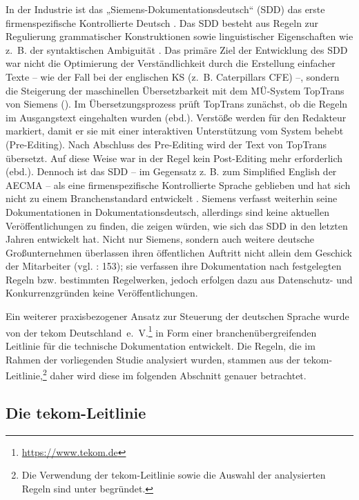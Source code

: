 In der Industrie ist das „Siemens-Dokumentationsdeutsch“ (SDD) das erste firmenspezifische Kontrollierte Deutsch \citep[375]{Göpferich2008}. Das SDD besteht aus Regeln zur Regulierung grammatischer Konstruktionen sowie linguistischer Eigenschaften wie z.~B. der syntaktischen Ambiguität \citep{Rascu2006}. Das primäre Ziel der Entwicklung des SDD war nicht die Optimierung der Verständlichkeit durch die Erstellung einfacher Texte -- wie der Fall bei der englischen KS (z.~B. Caterpillars CFE) --, sondern die Steigerung der maschinellen Übersetzbarkeit mit dem MÜ-System TopTrans von Siemens (\citealt{LehrndorferSchachtl1998}). Im Übersetzungsprozess prüft TopTrans zunächst, ob die Regeln im Ausgangstext eingehalten wurden (ebd.). Verstöße werden für den Redakteur markiert, damit er sie mit einer interaktiven Unterstützung vom System behebt (Pre-Editing). Nach Abschluss des Pre-Editing wird der Text von TopTrans übersetzt. Auf diese Weise war in der Regel kein Post-Editing mehr erforderlich (ebd.). Dennoch ist das SDD -- im Gegensatz z. B. zum Simplified English der AECMA -- als eine firmenspezifische Kontrollierte Sprache geblieben und hat sich nicht zu einem Branchenstandard entwickelt \citep[375]{Göpferich2008}. Siemens verfasst weiterhin seine Dokumentationen in Dokumentationsdeutsch, allerdings sind keine aktuellen Veröffentlichungen zu finden, die zeigen würden, wie sich das SDD in den letzten Jahren entwickelt hat. Nicht nur Siemens, sondern auch weitere deutsche Großunternehmen überlassen ihren öffentlichen Auftritt nicht allein dem Geschick der Mitarbeiter (vgl. \citealt{BaumertVerhein-Jarren2012}: 153); sie verfassen ihre Dokumentation nach festgelegten Regeln bzw. bestimmten Regelwerken, jedoch erfolgen dazu aus Datenschutz- und Konkurrenzgründen keine Veröffentlichungen.

Ein weiterer praxisbezogener Ansatz zur Steuerung der deutschen Sprache wurde von der tekom Deutschland~e.~V.\footnote{{{{\url{https://www.tekom.de}}}}} in Form einer branchenübergreifenden Leitlinie für die technische Dokumentation entwickelt. Die Regeln, die im Rahmen der vorliegenden Studie analysiert wurden, stammen aus der tekom-Leitlinie,\footnote{{{{Die Verwendung der tekom-Leitlinie sowie die Auswahl der analysierten Regeln sind unter  begründet.}}}} daher wird diese im folgenden Abschnitt genauer betrachtet.

\subsection{Die tekom-Leitlinie}%


